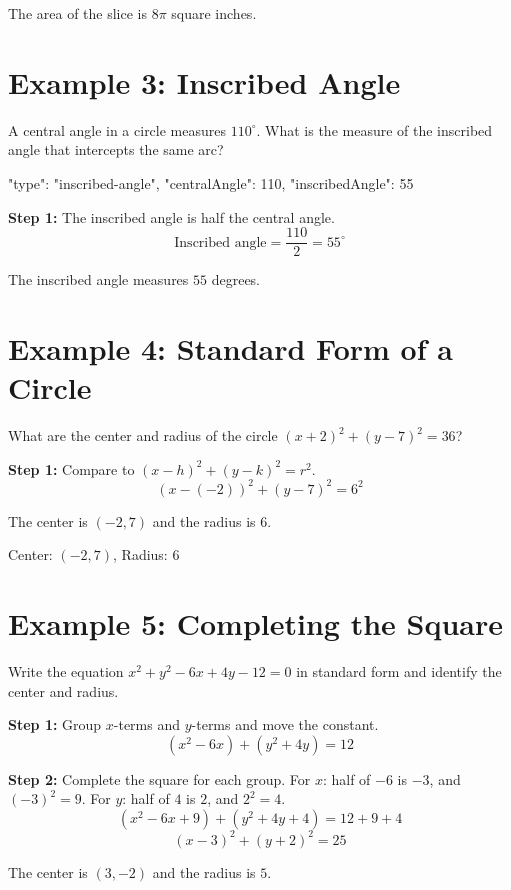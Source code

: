 \documentclass[14pt]{extarticle}
\begin{document}
The area of the slice is \(\boxed{8\pi}\) square inches.

\section*{Example 3: Inscribed Angle}

A central angle in a circle measures \(110^\circ\). What is the measure of the inscribed angle that intercepts the same arc?

\begin{diagramdata}
{
  "type": "inscribed-angle",
  "centralAngle": 110,
  "inscribedAngle": 55
}
\end{diagramdata}

\textbf{Step 1:} The inscribed angle is half the central angle.
\[
\text{Inscribed angle} = \frac{110}{2} = 55^\circ
\]

The inscribed angle measures \(\boxed{55}\) degrees.

\section*{Example 4: Standard Form of a Circle}

What are the center and radius of the circle \((x + 2)^2 + (y - 7)^2 = 36\)?

\textbf{Step 1:} Compare to \((x - h)^2 + (y - k)^2 = r^2\).
\[
(x - (-2))^2 + (y - 7)^2 = 6^2
\]

The center is \((-2, 7)\) and the radius is \(6\).

Center: \(\boxed{(-2, 7)}\), Radius: \(\boxed{6}\)

\section*{Example 5: Completing the Square}

Write the equation \(x^2 + y^2 - 6x + 4y - 12 = 0\) in standard form and identify the center and radius.

\textbf{Step 1:} Group \(x\)-terms and \(y\)-terms and move the constant.
\[
(x^2 - 6x) + (y^2 + 4y) = 12
\]

\textbf{Step 2:} Complete the square for each group. For \(x\): half of \(-6\) is \(-3\), and \((-3)^2 = 9\). For \(y\): half of \(4\) is \(2\), and \(2^2 = 4\).
\[
(x^2 - 6x + 9) + (y^2 + 4y + 4) = 12 + 9 + 4
\]
\[
(x - 3)^2 + (y + 2)^2 = 25
\]

The center is \((3, -2)\) and the radius is \(5\).
\end{document}
